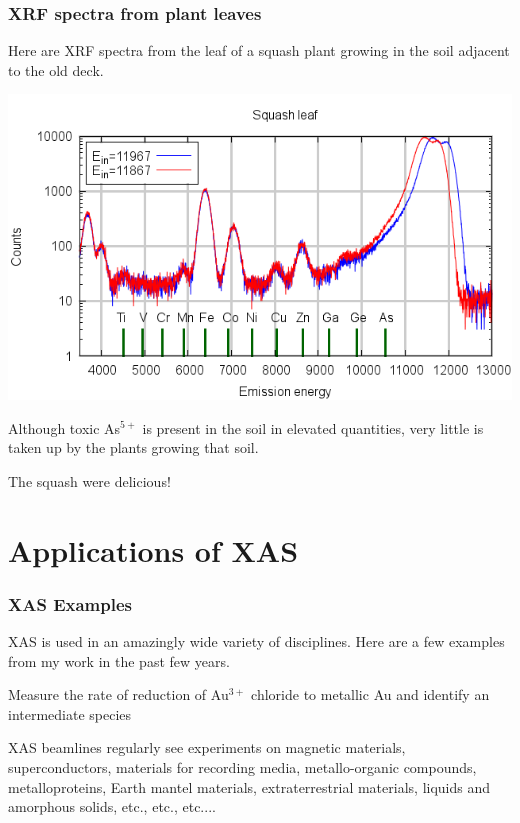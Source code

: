 \documentclass[10pt, xcolor=x11names, compress]{beamer}
\newcommand{\bton}{BaTaO$_2$N}
\begin{document}
\begin{frame}
  \frametitle{XRF spectra from plant leaves}
  Here are XRF spectra from the leaf of a squash plant growing in the
  soil adjacent to the old deck.
  \begin{center}
    \includegraphics[width=0.65\linewidth]{garden/squash_leaf.png}
  \end{center}
  Although toxic As$^{5+}$ is present in the soil in elevated
  quantities, very little is taken up by the plants growing that
  soil.

  \bigskip

  The squash were delicious!
\end{frame}

\section[XAS Applications]{Applications of XAS}

\begin{frame}
  \frametitle{XAS Examples}

  XAS is used in an amazingly wide variety of disciplines.  Here are
  a few examples from my work in the past few years.

  \bigskip

  \begin{description}
  \item[Economic geology] Measure the rate of reduction of Au$^{3+}$
    chloride to metallic Au and identify an intermediate species
  \end{description}

  \bigskip

  XAS beamlines regularly see experiments on magnetic materials,
  {\small superconductors}, {\footnotesize materials for recording
    media}, {\scriptsize metallo-organic compounds}, {\tiny
    metalloproteins, {\color{SlateGray4}Earth mantel materials},
    {\color{SlateGray3}extraterrestrial materials},
    {\color{SlateGray2}liquids and amorphous solids},
    {\color{SlateGray1}etc., etc., etc....}}
\end{frame}
\end{document}

